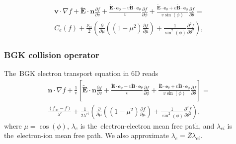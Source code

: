 \documentclass[preprint,12pt]{elsarticle}
\newcommand{\pdv}[2]{\frac{\partial{#1}}{\partial{#2}}}
\newcommand{\vect}[1]{\boldsymbol{#1}}
\newcommand{\mfpe}{\lambda_e}
\newcommand{\mfpei}{\lambda_{ei}}
\newcommand{\Zbar}{\bar{Z}}
\newcommand{\vmag}{v}
\newcommand{\vn}{\vect{n}}
\newcommand{\tE}{\vect{\tilde{E}}}
\newcommand{\tB}{\vect{\tilde{B}}}
\newcommand{\fM}{f_M}
\newcounter{bla}
\begin{document}
\begin{multline}
  \vect{v}\cdot\nabla f + \tE\cdot\vn \pdv{f}{\vmag} 
  + \frac{\tE\cdot\vect{e}_\phi 
  - \vmag\tB\cdot\vect{e}_\theta}{\vmag}\pdv{f}{\phi}
  + \frac{\tE\cdot\vect{e}_\theta + \vmag\tB\cdot\vect{e}_\phi}
  {\vmag\sin(\phi)}\pdv{f}{\theta} 
  =\\
  C_e(f) 
  + \frac{\nu_{ei}}{2} 
  \left(\pdv{}{\mu}\left((1 - \mu^2)\pdv{f}{\mu}\right)
  + \frac{1}{\sin^2(\phi)}\frac{\partial^2f}{\partial\theta^2} \right) ,
  \label{eq:Lorentz_spherical}
\end{multline}

\subsubsection{BGK collision operator}\label{sec:BGK_cop}
The~BGK electron transport equation in 6D reads
\begin{multline}
  \vn\cdot\nabla f + \frac{1}{\vmag} \left[ \tE\cdot\vn \pdv{f}{\vmag} 
  + \frac{\tE\cdot\vect{e}_\phi 
  - \vmag\tB\cdot\vect{e}_\theta}{\vmag}\pdv{f}{\phi}
  + \frac{\tE\cdot\vect{e}_\theta + \vmag\tB\cdot\vect{e}_\phi}
  {\vmag\sin(\phi)}\pdv{f}{\theta} \right] 
  =\\
  \frac{\left(\fM - f\right)}{\lambda^e} 
  + \frac{1}{2 \lambda^{ei}} 
  \left(\pdv{}{\mu}\left((1 - \mu^2)\pdv{f}{\mu}\right)
  + \frac{1}{\sin^2(\phi)}\frac{\partial^2f}{\partial\theta^2} \right) ,
  \label{eq:BGK_spherical}
\end{multline}
where $\mu = \cos(\phi)$, $\mfpe$ is the~electron-electron mean free path, and
$\mfpei$ is the~electron-ion mean free path. We also approximate
$\mfpe = \Zbar \mfpei$.
\end{document}
